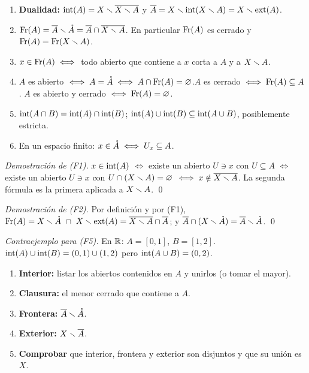\begin{teorema}
\begin{enumerate}[label=(F\arabic*),leftmargin=2.6em]
\item \textbf{Dualidad:} $\operatorname{int}(A)=X\smallsetminus\overline{X\smallsetminus A}$ \quad y \quad $\overline{A}=X\smallsetminus\operatorname{int}(X\smallsetminus A)=X\smallsetminus\operatorname{ext}(A)$.
\item $\operatorname{Fr}(A)=\overline{A}\smallsetminus\mathring{A}=\overline{A}\cap\overline{X\smallsetminus A}$. En particular $\operatorname{Fr}(A)$ es cerrado y $\operatorname{Fr}(A)=\operatorname{Fr}(X\smallsetminus A)$.
\item $x\in\operatorname{Fr}(A)\iff$ todo abierto que contiene a $x$ corta a $A$ y a $X\smallsetminus A$.
\item $A$ es abierto $\iff A=\mathring{A}\iff A\cap\operatorname{Fr}(A)=\varnothing$.\quad $A$ es cerrado $\iff\operatorname{Fr}(A)\subseteq A$.\quad
$A$ es abierto y cerrado $\iff\operatorname{Fr}(A)=\varnothing$.
\item $\operatorname{int}(A\cap B)=\operatorname{int}(A)\cap\operatorname{int}(B)$; \quad $\operatorname{int}(A)\cup\operatorname{int}(B)\subseteq\operatorname{int}(A\cup B)$, posiblemente estricta.
\item En un espacio finito: $x\in\mathring{A}\iff U_x\subseteq A$.
\end{enumerate}
\end{teorema}
\emph{Demostración de (F1).} $x\in\operatorname{int}(A)$ $\iff$ existe un abierto $U\ni x$ con $U\subseteq A$ $\iff$ existe un abierto
$U\ni x$ con $U\cap(X\smallsetminus A)=\varnothing$ $\iff x\notin\overline{X\smallsetminus A}$. La segunda fórmula es la primera aplicada a $X\smallsetminus A$. \qed

\emph{Demostración de (F2).} Por definición y por (F1), $\operatorname{Fr}(A)=X\smallsetminus\mathring{A}\ \cap\ X\smallsetminus\operatorname{ext}(A)=\overline{X\smallsetminus A}\cap\overline{A}$; y
$\overline{A}\cap(X\smallsetminus\mathring{A})=\overline{A}\smallsetminus\mathring{A}$. \qed

\emph{Contraejemplo para (F5).} En $\mathbb{R}$: $A=[0,1]$, $B=[1,2]$. $\operatorname{int}(A)\cup\operatorname{int}(B)=(0,1)\cup(1,2)$ pero
$\operatorname{int}(A\cup B)=(0,2)$.

\begin{metodo}
\begin{enumerate}[leftmargin=1.6em]
\item \textbf{Interior:} listar los abiertos contenidos en $A$ y unirlos (o tomar el mayor).
\item \textbf{Clausura:} el menor cerrado que contiene a $A$.
\item \textbf{Frontera:} $\overline{A}\smallsetminus\mathring{A}$.
\item \textbf{Exterior:} $X\smallsetminus\overline{A}$.
\item \textbf{Comprobar} que interior, frontera y exterior son disjuntos y que su unión es $X$.
\end{enumerate}
\end{metodo}

